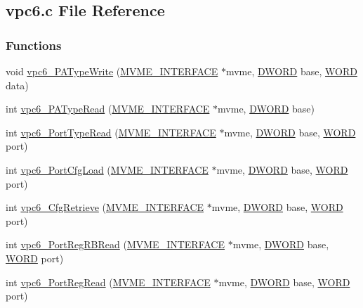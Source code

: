 \subsection{vpc6.c File Reference}
\label{vpc6_8c}
\subsubsection*{Functions}
\begin{DoxyCompactItemize}
\item 
void \hyperlink{vpc6_8c_aeebefabbb82c5db323d9d80f554586ce}{vpc6\_\-PATypeWrite} (\hyperlink{structMVME__INTERFACE}{MVME\_\-INTERFACE} $\ast$mvme, \hyperlink{vt2_8h_a798af1e30bc65f319c1a246cecf59e39}{DWORD} base, \hyperlink{vt2_8h_a2b0e863dadf920709ec53d9088ee7c91}{WORD} data)
\item 
int \hyperlink{vpc6_8c_afb94d63b60eab3d570396b532e3fdeec}{vpc6\_\-PATypeRead} (\hyperlink{structMVME__INTERFACE}{MVME\_\-INTERFACE} $\ast$mvme, \hyperlink{vt2_8h_a798af1e30bc65f319c1a246cecf59e39}{DWORD} base)
\item 
int \hyperlink{vpc6_8c_ac870864055cc5eea66f7229a2bd44073}{vpc6\_\-PortTypeRead} (\hyperlink{structMVME__INTERFACE}{MVME\_\-INTERFACE} $\ast$mvme, \hyperlink{vt2_8h_a798af1e30bc65f319c1a246cecf59e39}{DWORD} base, \hyperlink{vt2_8h_a2b0e863dadf920709ec53d9088ee7c91}{WORD} port)
\item 
int \hyperlink{vpc6_8c_a955d588da5b0d7274438f361309ec07b}{vpc6\_\-PortCfgLoad} (\hyperlink{structMVME__INTERFACE}{MVME\_\-INTERFACE} $\ast$mvme, \hyperlink{vt2_8h_a798af1e30bc65f319c1a246cecf59e39}{DWORD} base, \hyperlink{vt2_8h_a2b0e863dadf920709ec53d9088ee7c91}{WORD} port)
\item 
int \hyperlink{vpc6_8c_a7def69c129b90426d2c5834b18d1b81f}{vpc6\_\-CfgRetrieve} (\hyperlink{structMVME__INTERFACE}{MVME\_\-INTERFACE} $\ast$mvme, \hyperlink{vt2_8h_a798af1e30bc65f319c1a246cecf59e39}{DWORD} base, \hyperlink{vt2_8h_a2b0e863dadf920709ec53d9088ee7c91}{WORD} port)
\item 
int \hyperlink{vpc6_8c_a0d9b6b536c70f925f3abe043310b3f64}{vpc6\_\-PortRegRBRead} (\hyperlink{structMVME__INTERFACE}{MVME\_\-INTERFACE} $\ast$mvme, \hyperlink{vt2_8h_a798af1e30bc65f319c1a246cecf59e39}{DWORD} base, \hyperlink{vt2_8h_a2b0e863dadf920709ec53d9088ee7c91}{WORD} port)
\item 
int \hyperlink{vpc6_8c_a03b97f9c9cb620dfa76f19cefacb4f4e}{vpc6\_\-PortRegRead} (\hyperlink{structMVME__INTERFACE}{MVME\_\-INTERFACE} $\ast$mvme, \hyperlink{vt2_8h_a798af1e30bc65f319c1a246cecf59e39}{DWORD} base, \hyperlink{vt2_8h_a2b0e863dadf920709ec53d9088ee7c91}{WORD} port)

\end{DoxyCompactItemize}
